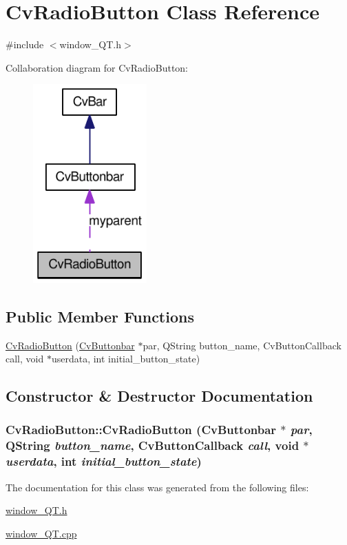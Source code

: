 \hypertarget{classCvRadioButton}{
\section{CvRadioButton Class Reference}
\label{classCvRadioButton}
}


{\ttfamily \#include $<$window\_\-QT.h$>$}



Collaboration diagram for CvRadioButton:\nopagebreak
\begin{figure}[H]
\begin{center}
\leavevmode
\includegraphics[width=124pt]{classCvRadioButton__coll__graph}
\end{center}
\end{figure}
\subsection*{Public Member Functions}
\begin{DoxyCompactItemize}
\item 
\hyperlink{classCvRadioButton_ac083eb56a708d7c70d12392b3c6bb1ba}{CvRadioButton} (\hyperlink{classCvButtonbar}{CvButtonbar} $\ast$par, QString button\_\-name, CvButtonCallback call, void $\ast$userdata, int initial\_\-button\_\-state)
\end{DoxyCompactItemize}


\subsection{Constructor \& Destructor Documentation}
\hypertarget{classCvRadioButton_ac083eb56a708d7c70d12392b3c6bb1ba}{
\subsubsection[{CvRadioButton}]{\setlength{\rightskip}{0pt plus 5cm}CvRadioButton::CvRadioButton ({\bf CvButtonbar} $\ast$ {\em par}, \/  QString {\em button\_\-name}, \/  CvButtonCallback {\em call}, \/  void $\ast$ {\em userdata}, \/  int {\em initial\_\-button\_\-state})}}
\label{classCvRadioButton_ac083eb56a708d7c70d12392b3c6bb1ba}


The documentation for this class was generated from the following files:\begin{DoxyCompactItemize}
\item 
\hyperlink{window__QT_8h}{window\_\-QT.h}\item 
\hyperlink{window__QT_8cpp}{window\_\-QT.cpp}\end{DoxyCompactItemize}
